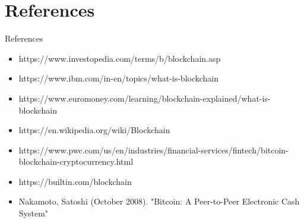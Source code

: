 \documentclass{beamer}
\begin{document}


	\section{References}
	\begin{frame}{References}
	\begin{itemize}
		\item https://www.investopedia.com/terms/b/blockchain.asp
		\item https://www.ibm.com/in-en/topics/what-is-blockchain
		\item https://www.euromoney.com/learning/blockchain-explained/what-is-blockchain
		\item https://en.wikipedia.org/wiki/Blockchain
		\item https://www.pwc.com/us/en/industries/financial-services/fintech/bitcoin-blockchain-cryptocurrency.html
		\item https://builtin.com/blockchain
		\item Nakamoto, Satoshi (October 2008). "Bitcoin: A Peer-to-Peer Electronic Cash System"
	\end{itemize}
	\end{frame}
\end{document}
